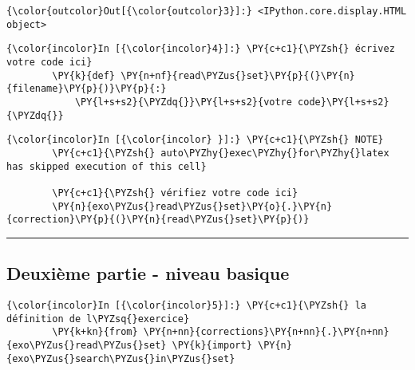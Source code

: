 \begin{Verbatim}[commandchars=\\\{\},frame=single,framerule=0.3mm,rulecolor=\color{cellframecolor}]
{\color{outcolor}Out[{\color{outcolor}3}]:} <IPython.core.display.HTML object>
\end{Verbatim}
            
    \begin{Verbatim}[commandchars=\\\{\},frame=single,framerule=0.3mm,rulecolor=\color{cellframecolor}]
{\color{incolor}In [{\color{incolor}4}]:} \PY{c+c1}{\PYZsh{} écrivez votre code ici}
        \PY{k}{def} \PY{n+nf}{read\PYZus{}set}\PY{p}{(}\PY{n}{filename}\PY{p}{)}\PY{p}{:}
            \PY{l+s+s2}{\PYZdq{}}\PY{l+s+s2}{votre code}\PY{l+s+s2}{\PYZdq{}}
\end{Verbatim}


    \begin{Verbatim}[commandchars=\\\{\},frame=single,framerule=0.3mm,rulecolor=\color{cellframecolor}]
{\color{incolor}In [{\color{incolor} }]:} \PY{c+c1}{\PYZsh{} NOTE}
        \PY{c+c1}{\PYZsh{} auto\PYZhy{}exec\PYZhy{}for\PYZhy{}latex has skipped execution of this cell}
        
        \PY{c+c1}{\PYZsh{} vérifiez votre code ici}
        \PY{n}{exo\PYZus{}read\PYZus{}set}\PY{o}{.}\PY{n}{correction}\PY{p}{(}\PY{n}{read\PYZus{}set}\PY{p}{)}
\end{Verbatim}


    \begin{center}\rule{0.5\linewidth}{\linethickness}\end{center}

    \hypertarget{deuxiuxe8me-partie---niveau-basique}{%
\subsection{Deuxième partie - niveau
basique}\label{deuxiuxe8me-partie---niveau-basique}}

    \begin{Verbatim}[commandchars=\\\{\},frame=single,framerule=0.3mm,rulecolor=\color{cellframecolor}]
{\color{incolor}In [{\color{incolor}5}]:} \PY{c+c1}{\PYZsh{} la définition de l\PYZsq{}exercice}
        \PY{k+kn}{from} \PY{n+nn}{corrections}\PY{n+nn}{.}\PY{n+nn}{exo\PYZus{}read\PYZus{}set} \PY{k}{import} \PY{n}{exo\PYZus{}search\PYZus{}in\PYZus{}set}
\end{Verbatim}


